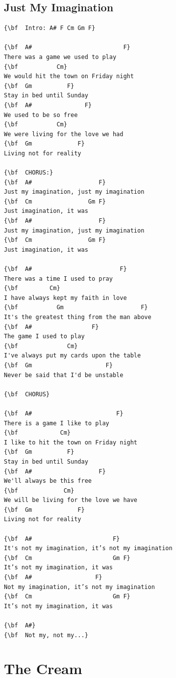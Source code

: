 \documentclass[a4paper]{article}
\begin{document}
\subsection{Just My Imagination}
\begin{Verbatim}[commandchars=\\\{\}]
{\bf  Intro: A# F Cm Gm F}

{\bf  A#                          F}
There was a game we used to play
{\bf           Cm}
We would hit the town on Friday night
{\bf  Gm          F}
Stay in bed until Sunday
{\bf  A#               F}
We used to be so free
{\bf           Cm}
We were living for the love we had
{\bf  Gm             F}
Living not for reality

{\bf  CHORUS:}
{\bf  A#                   F}
Just my imagination, just my imagination
{\bf  Cm                Gm F}
Just imagination, it was
{\bf  A#                   F}
Just my imagination, just my imagination
{\bf  Cm                Gm F}
Just imagination, it was

{\bf  A#                         F}
There was a time I used to pray
{\bf         Cm}
I have always kept my faith in love
{\bf           Gm                      F}
It's the greatest thing from the man above
{\bf  A#                 F}
The game I used to play
{\bf              Cm}
I've always put my cards upon the table
{\bf  Gm                     F}
Never be said that I'd be unstable

{\bf  CHORUS}

{\bf  A#                        F}
There is a game I like to play
{\bf            Cm}
I like to hit the town on Friday night
{\bf  Gm          F}
Stay in bed until Sunday
{\bf  A#                   F}
We'll always be this free
{\bf             Cm}
We will be living for the love we have
{\bf  Gm             F}
Living not for reality

{\bf  A#                       F}
It's not my imagination, it’s not my imagination
{\bf  Cm                       Gm F}
It’s not my imagination, it was
{\bf  A#                  F}
Not my imagination, it’s not my imagination
{\bf  Cm                       Gm F}
It’s not my imagination, it was

{\bf  A#}
{\bf  Not my, not my...}

\end{Verbatim}
\newpage
\section{The Cream}
\end{document}
